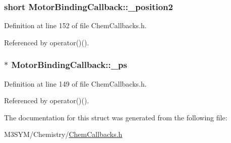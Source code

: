 \hypertarget{structMotorBindingCallback_a2be059308f68763b673f03cba3f204e3}{
\subsubsection[{\+\_\+position2}]{\setlength{\rightskip}{0pt plus 5cm}short Motor\+Binding\+Callback\+::\+\_\+position2}}\label{structMotorBindingCallback_a2be059308f68763b673f03cba3f204e3}


Definition at line 152 of file Chem\+Callbacks.\+h.



Referenced by operator()().

\hypertarget{structMotorBindingCallback_a62d13053a3c4913d5d2dc3d43d41223b}{
\subsubsection[{\+\_\+ps}]{$\ast$ Motor\+Binding\+Callback\+::\+\_\+ps}}\label{structMotorBindingCallback_a62d13053a3c4913d5d2dc3d43d41223b}


Definition at line 149 of file Chem\+Callbacks.\+h.



Referenced by operator()().



The documentation for this struct was generated from the following file\+:\begin{DoxyCompactItemize}
\item 
M3\+S\+Y\+M/\+Chemistry/\hyperlink{ChemCallbacks_8h}{Chem\+Callbacks.\+h}\end{DoxyCompactItemize}
